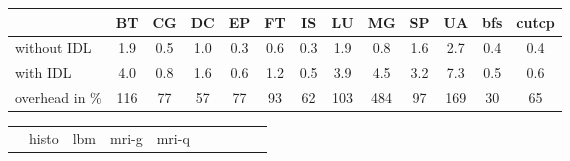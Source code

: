\begin{table}[p]
\centering
\begin{tabular}{lcccccccccccc}
  \toprule
  & \hspace{0.17mm}BT\hspace{0.17mm}
  & \hspace{0.17mm}CG\hspace{0.17mm}
  & \hspace{0.17mm}DC\hspace{0.17mm}
  & \hspace{0.17mm}EP\hspace{0.17mm}
  & \hspace{0.17mm}FT\hspace{0.17mm}
  & \hspace{0.17mm}IS\hspace{0.17mm}
  & \hspace{0.17mm}LU\hspace{0.17mm}
  & \hspace{0.17mm}MG\hspace{0.17mm}
  & \hspace{0.17mm}SP\hspace{0.17mm}
  & \hspace{0.17mm}UA\hspace{0.17mm}
  & \hspace{0.17mm}bfs\hspace{0.17mm}
  & \hspace{0.17mm}cutcp\hspace{0.17mm} \\
  \midrule
without IDL    & 1.9 & 0.5 & 1.0 & 0.3 & 0.6 & 0.3 & 1.9 & 0.8 & 1.6 & 2.7 & 0.4 & 0.4 \\[0.25em]
with IDL       & 4.0 & 0.8 & 1.6 & 0.6 & 1.2 & 0.5 & 3.9 & 4.5 & 3.2 & 7.3 & 0.5 & 0.6 \\[0.75em]
overhead in \% & 116 &  77 &  57 &  77 &  93 &  62 & 103 & 484 &  97 & 169 &  30 &  65 \\
  \bottomrule
\end{tabular}
\begin{tabular}{lccccccccc}
  \toprule
  & \hspace{0.44mm}histo\hspace{0.44mm}
  & \hspace{0.44mm}lbm\hspace{0.44mm}
  & \hspace{0.44mm}mri-g\hspace{0.44mm}
  & \hspace{0.44mm}mri-q\hspace{0.44mm}

\end{tabular}
\end{table}
